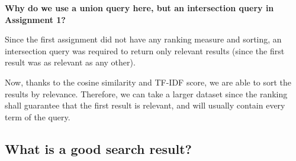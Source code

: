 \textbf{Why do we use a union query here, but an intersection query in Assignment 1?}

Since the first assignment did not have any ranking measure and sorting, an intersection query was required to return only relevant results (since the first result was as relevant as any other).

Now, thanks to the cosine similarity and TF-IDF score, we are able to sort the results by relevance. Therefore, we can take a larger dataset since the ranking shall guarantee that the first result is relevant, and will usually contain every term of the query.


\subsection{What is a good search result?}
